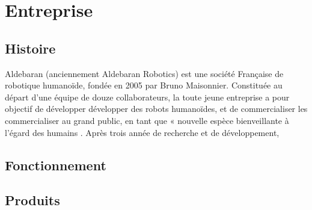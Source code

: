 \chapter*{Entreprise}
\label{Entreprise}
\thispagestyle{fancy}

\section{Histoire}
\label{Entreprise: histoire}
Aldebaran (anciennement Aldebaran Robotics) est une société Française de robotique humanoïde, fondée en 2005 par Bruno Maisonnier. 
Constituée au départ d'une équipe de douze collaborateurs, la toute jeune entreprise a pour objectif de développer développer des robots humanoïdes, et de commercialiser les commercialiser au grand public, en tant que « nouvelle espèce bienveillante à l'égard des humains . Après trois année de recherche et de développement, 

\section{Fonctionnement}

\section{Produits}
